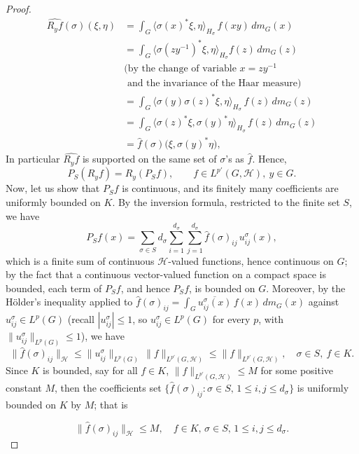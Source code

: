 \documentclass[10pt,a4paper]{amsart}
\begin{document}
\begin{proof}
\begin{align*}
\widehat{R_yf}(\sigma)(\xi,\eta)&=\int_G\langle\sigma(x)^*\xi,\eta\rangle_{H_\sigma}\,
f(xy)\,dm_G(x)\\
&=\int_G\langle\sigma(zy^{-1})^*\xi,\eta\rangle_{H_\sigma}f(z)\,dm_G(z)\\ 
&\text{(by the change of variable }   x=zy^{-1} \\
&\text{ and the invariance of the Haar measure})\\
&=\int_G\langle\sigma(y)\sigma(z)^*\xi,\eta\rangle_{H_\sigma}\,f(z)\,dm_G(z)\\
&=\int_G\langle\sigma(z)^*\xi,\sigma(y)^*\eta\rangle_{H_\sigma}\,f(z)\,dm_G(z)\\
&=\hat f(\sigma)\big(\xi,\sigma(y)^*\eta\big),
\end{align*}
 In particular $\widehat{R_yf}$ is
supported on the same set of $\sigma$'s as $\widehat f$.
Hence,
$$
P_S(R_yf)=R_y(P_Sf),\qquad f\in L^{p'}(G,\mathcal{H}),\ y\in G. 
$$
Now, let us show that $P_Sf$ is continuous, and its finitely many coefficients are uniformly
bounded on $K$. By the inversion formula, restricted to the finite set $S$, we have
$$
P_Sf(x)=\sum_{\sigma\in S}d_\sigma\sum_{i=1}^{d_\sigma}\sum_{j=1}^{d_\sigma}\widehat f(\sigma)_{ij}\,
u^\sigma_{ij}(x),
$$
which is a finite sum of continuous $\mathcal{H}$-valued functions, hence continuous on $G$; by
the fact that a continuous vector-valued function on a compact space is bounded, each term of $P_Sf$, and hence $P_Sf$, is
bounded on $G$. Moreover, by  the H\"older's inequality applied to
$\widehat f(\sigma)_{ij}=\displaystyle\int_G\overline{u^\sigma_{ij}(x)}\,f(x)\,dm_G(x)$ against
$u^\sigma_{ij}\in L^p(G)$ (recall $|u^\sigma_{ij}|\le1$, so $u^\sigma_{ij}\in
L^p(G)$ for every $p$, with $\|u^\sigma_{ij}\|_{L^p(G)}\le1$), we have 
$$
\|\widehat f(\sigma)_{ij}\|_\mathcal{H}\le\|u^\sigma_{ij}\|_{L^p(G)}\,\|f\|_{L^{p'}(G,\mathcal{H})}\le
\|f\|_{L^{p'}(G,\mathcal{H})},\quad\sigma\in S,\ f\in K.
$$
Since $K$ is bounded, say for all $f\in K$, $\|f\|_{L^{p'}(G,\mathcal{H})}\le M$ for some positive constant $M$,  then the coefficients set 
 $\{\widehat f(\sigma)_{ij}:\sigma\in S,\,1\le i,j\le
d_\sigma\}$ is uniformly bounded on $K$ by $M$; that is 

\begin{equation}\label{CoeffBound}
\|\widehat f(\sigma)_{ij}\|_\mathcal{H}\le M,\quad f\in K,\, \sigma\in S,\,1\le i,j\le
d_\sigma.
\end{equation}


\end{proof}
\end{document}
